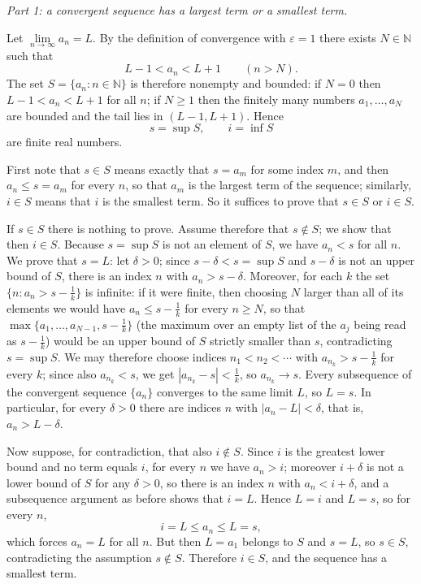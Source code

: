 \documentclass[11pt,a4paper]{article}
\newenvironment{solution}[1]{%
  \par\addvspace{1.7ex}%
  \noindent{\color{solutioncolor}\textbf{#1}}\hspace{0.55em}\ignorespaces}%
  {\par\addvspace{0.9ex}}
\begin{document}
\begin{solution}{Solution 2.1.7}\label{xs:2.1.7}
\emph{Part 1: a convergent sequence has a largest term or a smallest term.}

Let $\lim\limits_{n\to\infty}a_n=L$. By the definition of convergence with $\varepsilon=1$ there exists $N\in\mathbb{N}$ such that
\[
L-1<a_n<L+1\qquad(n>N).
\]
The set $S=\{a_n:n\in\mathbb{N}\}$ is therefore nonempty and bounded: if $N=0$ then $L-1<a_n<L+1$ for all $n$; if $N\ge 1$ then the finitely many numbers $a_1,\dots,a_N$ are bounded and the tail lies in $(L-1,L+1)$. Hence
\[
s=\sup S,\qquad i=\inf S
\]
are finite real numbers.

First note that $s\in S$ means exactly that $s=a_m$ for some index $m$, and then $a_n\le s=a_m$ for every $n$, so that $a_m$ is the largest term of the sequence; similarly, $i\in S$ means that $i$ is the smallest term. So it suffices to prove that $s\in S$ or $i\in S$.

If $s\in S$ there is nothing to prove. Assume therefore that $s\notin S$; we show that then $i\in S$. Because $s=\sup S$ is not an element of $S$, we have $a_n<s$ for all $n$. We prove that $s=L$: let $\delta>0$; since $s-\delta<s=\sup S$ and $s-\delta$ is not an upper bound of $S$, there is an index $n$ with $a_n>s-\delta$. Moreover, for each $k$ the set $\{n:a_n>s-\frac1k\}$ is infinite: if it were finite, then choosing $N$ larger than all of its elements we would have $a_n\le s-\frac1k$ for every $n\ge N$, so that $\max\{a_1,\dots,a_{N-1},s-\frac1k\}$ (the maximum over an empty list of the $a_j$ being read as $s-\frac1k$) would be an upper bound of $S$ strictly smaller than $s$, contradicting $s=\sup S$. We may therefore choose indices $n_1<n_2<\cdots$ with $a_{n_k}>s-\frac1k$ for every $k$; since also $a_{n_k}<s$, we get $|a_{n_k}-s|<\frac1k$, so $a_{n_k}\to s$. Every subsequence of the convergent sequence $\{a_n\}$ converges to the same limit $L$, so $L=s$. In particular, for every $\delta>0$ there are indices $n$ with $|a_n-L|<\delta$, that is, $a_n>L-\delta$.

Now suppose, for contradiction, that also $i\notin S$. Since $i$ is the greatest lower bound and no term equals $i$, for every $n$ we have $a_n>i$; moreover $i+\delta$ is not a lower bound of $S$ for any $\delta>0$, so there is an index $n$ with $a_n<i+\delta$, and a subsequence argument as before shows that $i=L$. Hence $L=i$ and $L=s$, so for every $n$,
\[
i=L\le a_n\le L=s ,
\]
which forces $a_n=L$ for all $n$. But then $L=a_1$ belongs to $S$ and $s=L$, so $s\in S$, contradicting the assumption $s\notin S$. Therefore $i\in S$, and the sequence has a smallest term.


\end{solution}
\end{document}
